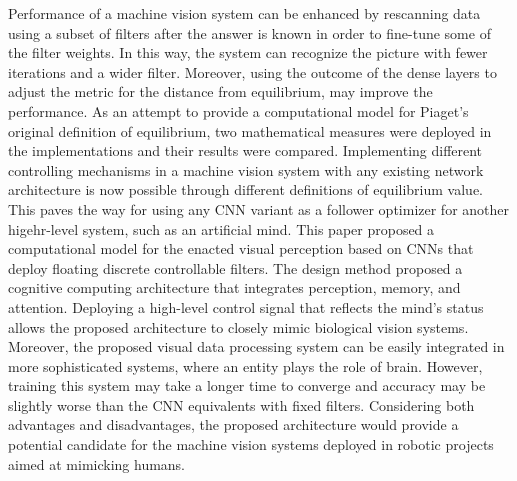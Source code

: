 \documentclass[journal]{IEEEtran}
\begin{document}
Performance of a machine vision system can be enhanced by rescanning data using a subset of filters after the answer is known in order to fine-tune some of the filter weights. In this way, the system can recognize the picture with fewer iterations and a wider filter. Moreover, using the outcome of the dense layers to adjust the metric for the distance from equilibrium, may improve the performance. As an attempt to provide a computational model for Piaget's original definition of equilibrium, two mathematical measures were deployed in the implementations and their results were compared. Implementing different controlling mechanisms in a machine vision system with any existing network architecture is now possible through different definitions of equilibrium value. This paves the way for using any CNN variant as a follower optimizer for another higehr-level system, such as an artificial mind. This paper proposed a computational model for the enacted visual perception based on CNNs that deploy floating discrete controllable filters. The design method proposed a cognitive computing architecture that integrates perception, memory, and attention. Deploying a high-level control signal that reflects the mind's status allows the proposed architecture to closely mimic biological vision systems. Moreover, the proposed visual data processing system can be easily integrated in more sophisticated systems, where an entity plays the role of brain. However, training this system may take a longer time to converge and accuracy may be slightly worse than the CNN equivalents with fixed filters. Considering both advantages and disadvantages, the proposed architecture would provide a potential candidate for the machine vision systems deployed in robotic projects aimed at mimicking humans.  



\end{document}
